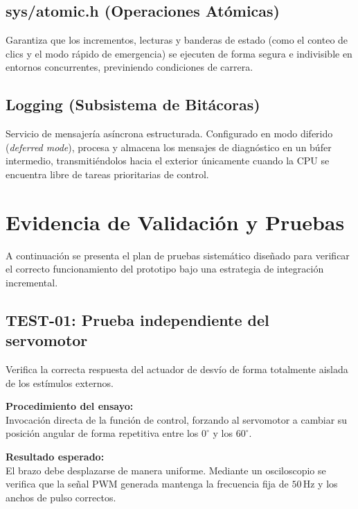 \documentclass[12pt, letterpaper]{article}
\begin{document}
\subsection{sys/atomic.h (Operaciones Atómicas)}
Garantiza que los incrementos, lecturas y banderas de estado (como el conteo de clics y el modo rápido de emergencia) se ejecuten de forma segura e indivisible en entornos concurrentes, previniendo condiciones de carrera.

\subsection{Logging (Subsistema de Bitácoras)}
Servicio de mensajería asíncrona estructurada. Configurado en modo diferido (\textit{deferred mode}), procesa y almacena los mensajes de diagnóstico en un búfer intermedio, transmitiéndolos hacia el exterior únicamente cuando la CPU se encuentra libre de tareas prioritarias de control.

\section{Evidencia de Validación y Pruebas}
\label{sec:evidencia_validacion}

A continuación se presenta el plan de pruebas sistemático diseñado para verificar el correcto funcionamiento del prototipo bajo una estrategia de integración incremental.

\subsection{TEST-01: Prueba independiente del servomotor}
Verifica la correcta respuesta del actuador de desvío de forma totalmente aislada de los estímulos externos.

\vspace{0.5cm}

\noindent \textbf{Procedimiento del ensayo:} \\
Invocación directa de la función de control, forzando al servomotor a cambiar su posición angular de forma repetitiva entre los $0^\circ$ y los $60^\circ$.

\vspace{0.5cm}

\noindent \textbf{Resultado esperado:} \\
El brazo debe desplazarse de manera uniforme. Mediante un osciloscopio se verifica que la señal PWM generada mantenga la frecuencia fija de $50\,$Hz y los anchos de pulso correctos.
\end{document}
